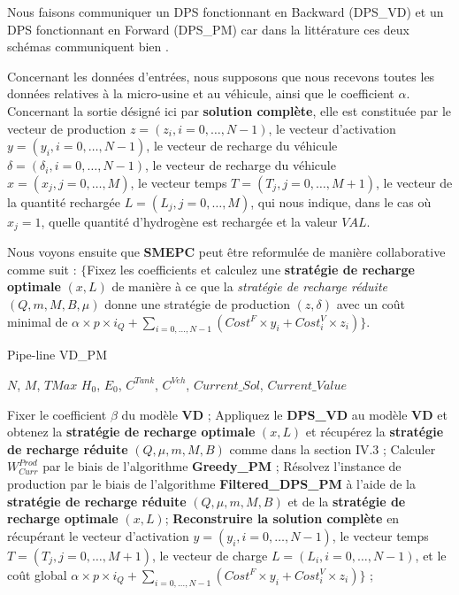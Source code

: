 \begin{Rem}
	Nous faisons communiquer un DPS fonctionnant en Backward (DPS\_VD) et un DPS fonctionnant en Forward (DPS\_PM) car dans la littérature ces deux schémas communiquent \og bien \fg{}.
\end{Rem}
Concernant les données d'entrées, nous supposons que nous recevons toutes les données relatives à la micro-usine et au véhicule, ainsi que le coefficient $\alpha$. Concernant la sortie désigné ici par \textbf{solution complète}, elle est constituée par le vecteur de production $z = (z_i, i = 0, \dots, N-1)$, le vecteur d'activation $y = (y_i, i = 0, \dots, N-1)$, le vecteur de recharge du véhicule $\delta= (\delta_i, i = 0, \dots, N-1)$, le vecteur de recharge du véhicule $x = (x_j, j = 0, \dots, M)$, le vecteur temps $T = (T_j, j = 0, \dots, M+1)$, le vecteur de la quantité rechargée $L = (L_j, j = 0, \dots, M)$, qui nous indique, dans le cas où $x_j = 1$, quelle quantité d'hydrogène est rechargée et la valeur $VAL$.

Nous voyons ensuite que \textbf{SMEPC} peut être reformulée de manière collaborative comme suit : $\{$Fixez les coefficients et calculez une \textbf{stratégie de recharge optimale} $(x, L)$ de manière à ce que la \textit{stratégie de recharge réduite} $(Q, m, M, B, \mu)$ donne une stratégie de production $(z,\delta )$ avec un coût minimal de $\alpha \times p\times i_Q + \sum_{i = 0, \dots, N -1} (Cost^F\times y_i + Cost^V_i \times z_i)\}$.

\begin{algorithm} 
	\caption{Pipe-line VD\_PM}
	\label{VD-PM-Pipe-line}
	\begin{algorithmic}[1]
		\REQUIRE $N$, $M$, $TMax$ $H_0$, $E_0$, $C^{Tank}$, $C^{Veh}$,
		\ENSURE $Current\_Sol$, $Current\_Value$
		\hline
		
		\vspace{0.3cm}
		
		\STATE Fixer le coefficient $\beta$ du modèle \textbf{VD} ; 
		\STATE Appliquez le \textbf{DPS\_VD} au modèle \textbf{VD} et obtenez la \textbf{stratégie de recharge optimale} $(x, L)$ et récupérez la \textbf{stratégie de recharge réduite} $(Q,\mu , m, M, B)$ comme dans la section IV.3 ;
		\STATE Calculer $W^{Prod}_{Curr}$ par le biais de l'algorithme \textbf{Greedy\_PM} ;
		\STATE Résolvez l'instance de production par le biais de l'algorithme \textbf{Filtered\_DPS\_PM} à l'aide de la \textbf{stratégie de recharge réduite} $(Q,\mu , m, M, B)$ et de la \textbf{stratégie de recharge optimale} $(x, L)$;
		\STATE \textbf{Reconstruire la solution complète} en récupérant le vecteur d'activation $y = (y_i, i = 0, \dots, N-1 )$, le vecteur temps $T = (T_j, j = 0, \dots, M+1 )$, le vecteur de charge $L = (L_i, i = 0, \dots, N-1 )$, et le coût global $\alpha \times p\times i_Q + \sum_{i = 0, \dots, N -1} (Cost^F\times y_i + Cost^V_i \times z_i)\}$ ;
	\end{algorithmic}
\end{algorithm}

